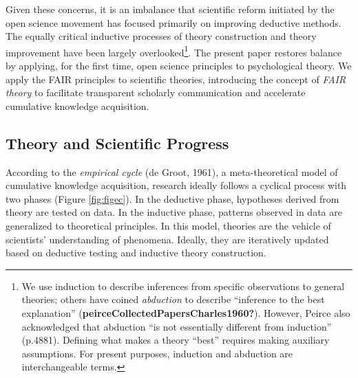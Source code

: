 \documentclass[
  man,floatsintext]{apa6}
\begin{document}
Given these concerns, it is an imbalance that scientific reform initiated by the open science movement has focused primarily on improving deductive methods.
The equally critical inductive processes of theory construction and theory improvement have been largely overlooked\footnote{We use induction to describe inferences from specific observations to general theories; others have coined \emph{abduction} to describe ``inference to the best explanation'' (\textbf{peirceCollectedPapersCharles1960?}). However, Peirce also acknowledged that abduction ``is not essentially different from induction'' (p.4881). Defining what makes a theory ``best'' requires making auxiliary assumptions. For present purposes, induction and abduction are interchangeable terms.}.
The present paper restores balance by applying, for the first time,
open science principles to psychological theory.
We apply the FAIR principles to scientific theories,
introducing the concept of \emph{FAIR theory} to
facilitate transparent scholarly communication and accelerate cumulative knowledge acquisition.

\subsection{Theory and Scientific Progress}\label{theory-and-scientific-progress}

According to the \emph{empirical cycle} (de Groot, 1961),
a meta-theoretical model of cumulative knowledge acquisition,
research ideally follows a cyclical process with two phases (Figure \ref{fig:figec}).
In the deductive phase, hypotheses derived from theory are tested on data. In the inductive phase, patterns observed in data are generalized to theoretical principles.
In this model, theories are the vehicle of scientists' understanding of phenomena.
Ideally, they are iteratively updated based on deductive testing and inductive theory construction.
\end{document}
